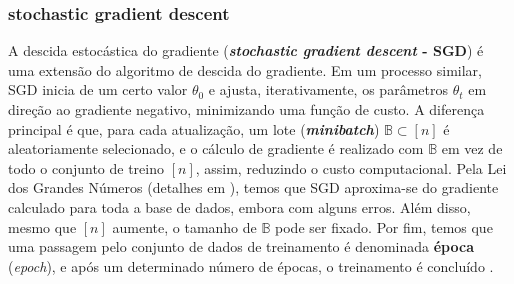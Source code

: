 \documentclass{automatextcc}
\begin{document}



\subsubsection{stochastic gradient descent}
A descida estocástica do gradiente (\textbf{\textit{stochastic gradient descent} - SGD}) é uma extensão do algoritmo de descida do gradiente. Em um processo similar, SGD inicia de um certo valor $\theta_0$ e ajusta, iterativamente, os parâmetros $\theta_t$ em direção ao gradiente negativo, minimizando uma função de custo. A diferença principal é que, para cada atualização, um lote (\textbf{\textit{minibatch}}) $\mathbb{B} \subset [n]$ é aleatoriamente selecionado, e o cálculo de gradiente é realizado com $\mathbb{B}$ em vez de todo o conjunto de treino $[n]$, assim, reduzindo o custo computacional. Pela Lei dos Grandes Números (detalhes em \citet{seneta2013}), temos que SGD aproxima-se do gradiente calculado para toda a base de dados, embora com alguns erros. Além disso, mesmo que $[n]$ aumente, o tamanho de $\mathbb{B}$ pode ser fixado. Por fim, temos que uma passagem pelo conjunto de dados de treinamento é denominada \textbf{época} (\textit{epoch}), e após um determinado número de épocas, o treinamento é concluído \citep{goodfellow2016, fan2021}.




\end{document}
